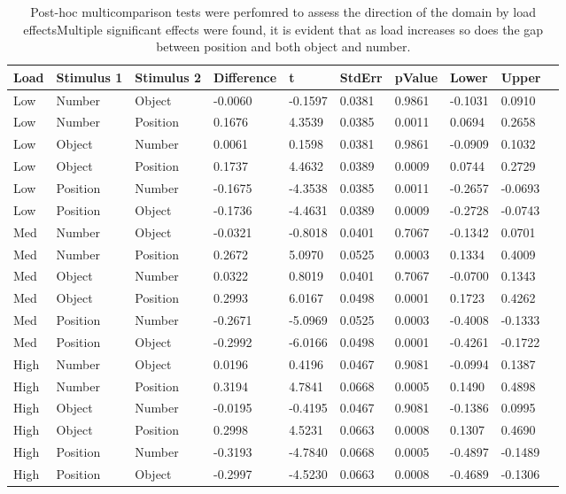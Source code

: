 \begin{table}
\centering
\begin{tabular}[0.2em]{@{}llllllllll@{}}\toprule
Load & Stimulus 1 & Stimulus 2 & Difference & t & StdErr & pValue & Lower & Upper\\\toprule[0.2em]
Low & Number & Object & -0.0060 & -0.1597 & 0.0381 & 0.9861 & -0.1031 & 0.0910 \\\midrule
Low & Number & Position & 0.1676 & 4.3539 & 0.0385 & 0.0011 & 0.0694 & 0.2658 \\\midrule
Low & Object & Number & 0.0061 & 0.1598 & 0.0381 & 0.9861 & -0.0909 & 0.1032 \\\midrule
Low & Object & Position & 0.1737 & 4.4632 & 0.0389 & 0.0009 & 0.0744 & 0.2729 \\\midrule
Low & Position & Number & -0.1675 & -4.3538 & 0.0385 & 0.0011 & -0.2657 & -0.0693 \\\midrule
Low & Position & Object & -0.1736 & -4.4631 & 0.0389 & 0.0009 & -0.2728 & -0.0743 \\\midrule
Med & Number & Object & -0.0321 & -0.8018 & 0.0401 & 0.7067 & -0.1342 & 0.0701 \\\midrule
Med & Number & Position & 0.2672 & 5.0970 & 0.0525 & 0.0003 & 0.1334 & 0.4009 \\\midrule
Med & Object & Number & 0.0322 & 0.8019 & 0.0401 & 0.7067 & -0.0700 & 0.1343 \\\midrule
Med & Object & Position & 0.2993 & 6.0167 & 0.0498 & 0.0001 & 0.1723 & 0.4262 \\\midrule
Med & Position & Number & -0.2671 & -5.0969 & 0.0525 & 0.0003 & -0.4008 & -0.1333 \\\midrule
Med & Position & Object & -0.2992 & -6.0166 & 0.0498 & 0.0001 & -0.4261 & -0.1722 \\\midrule
High & Number & Object & 0.0196 & 0.4196 & 0.0467 & 0.9081 & -0.0994 & 0.1387 \\\midrule
High & Number & Position & 0.3194 & 4.7841 & 0.0668 & 0.0005 & 0.1490 & 0.4898 \\\midrule
High & Object & Number & -0.0195 & -0.4195 & 0.0467 & 0.9081 & -0.1386 & 0.0995 \\\midrule
High & Object & Position & 0.2998 & 4.5231 & 0.0663 & 0.0008 & 0.1307 & 0.4690 \\\midrule
High & Position & Number & -0.3193 & -4.7840 & 0.0668 & 0.0005 & -0.4897 & -0.1489 \\\midrule
High & Position & Object & -0.2997 & -4.5230 & 0.0663 & 0.0008 & -0.4689 & -0.1306 \\\bottomrule[0.2em]
\end{tabular}
\caption{Post-hoc multicomparison tests were perfomred to assess the direction of the domain by load effectsMultiple significant effects were found, it is evident that as load increases so does the gap between position and both object and number.\label{tabel:behStudy1RTphloadbydomain}}
\end{table}
